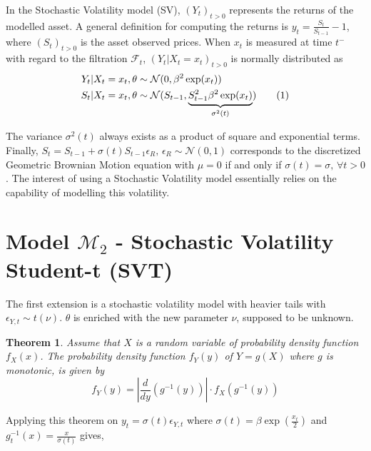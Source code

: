 \documentclass[11pt,a4,twosided,singlespacing,titlepagenumber=on]{scrreprt}
\numberwithin{equation}{chapter} %
\newtheorem{theorem}{Theorem}%
\theoremstyle{remark}
\newcommand\numberthis{\addtocounter{equation}{1}\tag{\theequation}}
\begin{document}
In the Stochastic Volatility model (SV), $(Y_t)_{t>0}$ represents the returns of the modelled asset. A general definition for computing the returns is $y_t = \frac{S_t}{S_{t-1}}-1$, where $(S_t)_{t>0}$ is the asset observed prices. When $x_t$ is measured at time $t^-$ with regard to the filtration $\mathcal{F}_t$, $(Y_t|X_t = x_t)_{t>0}$ is normally distributed as
\begin{align*}
Y_t | X_t = x_t, \theta 					&\sim \mathcal{N}(0, \beta^2 \exp(x_t)) \\
S_t | X_t = x_t, \theta 					&\sim \mathcal{N}(S_{t-1}, \underbrace{S_{t-1}^2 \beta^2 \exp(x_t)}_{\sigma^2(t)}) \numberthis
\end{align*}


 The variance $\sigma^2(t)$ always exists as a product of square and exponential terms. Finally, $S_t = S_{t-1} + \sigma(t) S_{t-1} \epsilon_R \text{, } \epsilon_R \sim \mathcal{N}(0,1)$ corresponds to the discretized Geometric Brownian Motion equation with $\mu = 0$ if and only if $\sigma(t) = \sigma \text{, } \forall t > 0$. The interest of using a Stochastic Volatility model essentially relies on the capability of modelling this volatility.

\section{Model $\mathcal{M}_2$ - Stochastic Volatility Student-t (SVT)}
The first extension is a stochastic volatility model with heavier tails with $\epsilon_{Y,t} \sim t(\nu)$. $\theta$ is enriched with the new parameter $\nu$, supposed to be unknown.

\begin{theorem}
\textit{
Assume that $X$ is a random variable of probability density function $f_X(x)$. The probability density function $f_Y(y)$ of $Y=g(X)$ where $g$ is monotonic, is given by
}
\begin{equation}
f_Y(y) = \left|\frac{d}{dy}(g^{-1}(y))\right| \cdot f_X(g^{-1}(y))
\end{equation}
\end{theorem}


Applying this theorem on $y_t = \sigma(t) \epsilon_{Y,t}$ where $\sigma(t) = \beta \exp \left(\frac{x_t}{2} \right)$ and $g^{-1}_t(x) = \frac{x}{\sigma(t)}$ gives,
\end{document}
